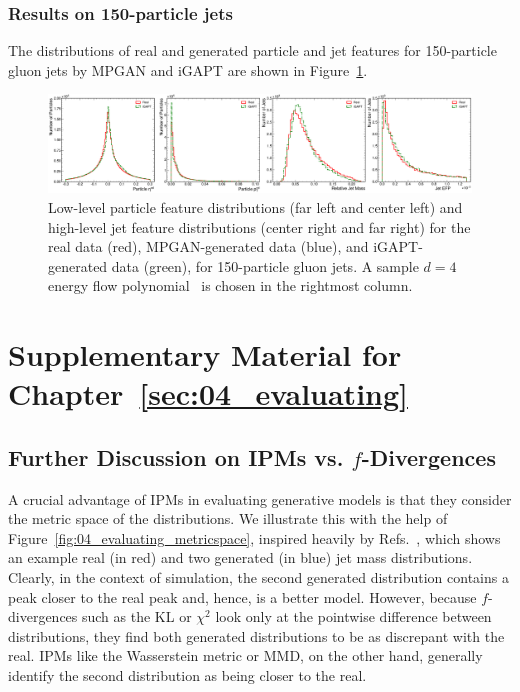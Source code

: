 \subsection{Results on 150-particle jets}
\label{app:04_gapt_150}

The distributions of real and generated particle and jet features for 150-particle gluon jets by MPGAN and iGAPT are shown in Figure~\ref{fig:04_gapt_feature_distributions_150}.

\begin{figure}[ht]
    \centering
    \includegraphics[width=\textwidth]{figures/04-ML4Sim/igapt/feature_distributions_150.pdf}
    \caption[Low-level particle feature distributions and high-level jet feature distributions for 150-particle gluon jets.]{Low-level particle feature distributions (far left and center left) and high-level jet feature distributions (center right and far right) for the real data (red), MPGAN-generated data (blue), and iGAPT-generated data (green), for 150-particle gluon jets.
    A sample $d = 4$ energy flow polynomial~\cite{Komiske:2017aww} is chosen in the rightmost column.
    }
    \label{fig:04_gapt_feature_distributions_150}
\end{figure}


\chapter{Supplementary Material for Chapter~\ref{sec:04_evaluating}}

\section{Further Discussion on IPMs vs. \texorpdfstring{$f$}{f}-Divergences}
\label{app:04_evaluating_metricspace}

A crucial advantage of IPMs in evaluating generative models is that they consider the metric space of the distributions.
We illustrate this with the help of Figure~\ref{fig:04_evaluating_metricspace}, inspired heavily by Refs.~\cite{gretton_talk, w1_stackoverflow}, which shows an example real (in red) and two generated (in blue) jet mass distributions.
Clearly, in the context of simulation, the second generated distribution contains a peak closer to the real peak and, hence, is a better model.
However, because $f$-divergences such as the KL or $\chi^2$ look only at the pointwise difference between distributions, they find both generated distributions to be as discrepant with the real.
IPMs like the Wasserstein metric or MMD, on the other hand, generally identify the second distribution as being closer to the real.

